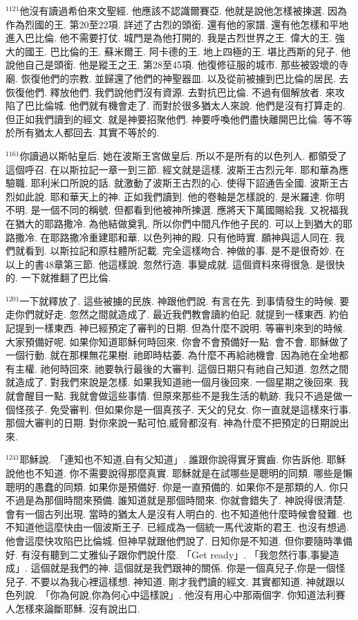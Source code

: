 \documentclass{book}
\begin{document}
$^{1121}$他沒有讀過希伯來文聖經.
他應該不認識爾賽亞.
他就是說他怎樣被揀選.
因為作為烈國的王.
第20至22項.
詳述了古烈的頭銜.
還有他的家譜.
還有他怎樣和平地進入巴比倫.
他不需要打仗.
城門是為他打開的.
我是古烈世界之王.
偉大的王.
強大的國王.
巴比倫的王.
蘇米爾王.
阿卡德的王.
地上四極的王.
堪比西斯的兒子.
他說他自己是頭銜.
他是縱王之王.
第28至45項.
他復修征服的城市.
那些被毀壞的寺廟.
恢復他們的宗教.
並歸還了他們的神聖器皿.
以及從前被擄到巴比倫的居民.
去恢復他們.
釋放他們.
我們說他們沒有資源.
去對抗巴比倫.
不過有個解放者.
來攻陷了巴比倫城.
他們就有機會走了.
而對於很多猶太人來說.
他們是沒有打算走的.
但正如我們讀到的經文.
就是神要招聚他們.
神要呼喚他們盡快離開巴比倫.
等不等於所有猶太人都回去.
其實不等於的.

$^{1161}$你讀過以斯帖皇后.
她在波斯王宮做皇后.
所以不是所有的以色列人.
都領受了這個呼召.
在以斯拉記一章一到三節.
經文就是這樣.
波斯王古烈元年.
耶和華為應驗職.
耶利米口所說的話.
就激動了波斯王古烈的心.
使得下詔通告全國.
波斯王古烈如此說.
耶和華天上的神.
正如我們讀到.
他的卷軸是怎樣說的.
是米羅達.
你明不明.
是一個不同的稱號.
但都看到他被神所揀選.
應將天下萬國賜給我.
又祝福我在猶大的耶路撒冷.
為他結做奠乳.
所以你們中間凡作他子民的.
可以上到猶大的耶路撒冷.
在耶路撒冷重建耶和華.
以色列神的殿.
只有他時實.
願神與這人同在.
我們就看到.
以斯拉記和原柱體所記載.
完全這樣吻合.
神做的事.
是不是很奇妙.
在以上的書48章第三節.
他這樣說.
忽然行造.
事變成就.
這個資料來得很急.
是很快的.
一下就推翻了巴比倫.

$^{1201}$一下就釋放了.
這些被擄的民族.
神跟他們說.
有言在先.
到事情發生的時候.
要走你們就好走.
忽然之間就造成了.
最近我們教會讀約伯記.
就提到一樣東西.
約伯記提到一樣東西.
神已經預定了審判的日期.
但為什麼不說明.
等審判來到的時候.
大家預備好呢.
如果你知道耶穌何時回來.
你會不會預備好一點.
會不會.
耶穌做了一個行動.
就在那棵無花果樹.
祂即時枯萎.
為什麼不再給祂機會.
因為祂在全地都有主權.
祂何時回來.
祂要執行最後的大審判.
這個日期只有祂自己知道.
忽然之間就造成了.
對我們來說是怎樣.
如果我知道祂一個月後回來.
一個星期之後回來.
我就會醒目一點.
我就會做這些事情.
但原來那些不是我生活的軌跡.
我只不過是做一個怪孩子.
免受審判.
但如果你是一個真孩子.
天父的兒女.
你一直就是這樣來行事.
那個大審判的日期.
對你來說一點可怕,威脅都沒有.
神為什麼不把預定的日期說出來.

$^{1241}$耶穌說.
「連知也不知道,自有父知道」.
誰跟你說得實牙實齒.
你告訴他.
耶穌說他也不知道.
你不需要說得那麼真實.
耶穌就是在試哪些是聰明的同類.
哪些是懶聰明的愚蠢的同類.
如果你是預備好.
你是一直預備的.
如果你不是那類的人.
你只不過是為那個時間來預備.
誰知道就是那個時間來.
你就會錯失了.
神說得很清楚.
會有一個古列出現.
當時的猶太人是沒有人明白的.
也不知道他什麼時候會發難.
也不知道他這麼快由一個波斯王子.
已經成為一個統一馬代波斯的君王.
也沒有想過.
他會這麼快攻陷巴比倫城.
但神早就跟他們說了.
日知你是不知道.
但你要隨時準備好.
有沒有聽到二丈雅仙子跟你們說什麼.
「Get ready」.
「我忽然行事,事變造成」.
這個就是我們的神.
這個就是我們跟神的關係.
你是一個真兒子,你是一個怪兒子.
不要以為我心裡這樣想.
神知道.
剛才我們讀的經文.
其實都知道.
神就跟以色列說.
「你為何說,你為何心中這樣說」.
他沒有用心中那兩個字.
你知道法利賽人怎樣來論斷耶穌.
沒有說出口.
\end{document}
